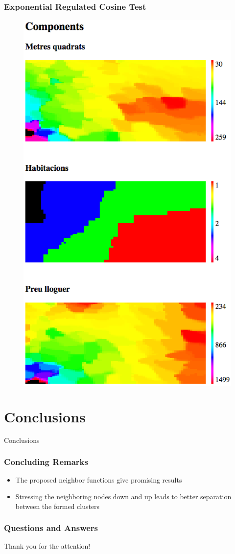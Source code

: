 \documentclass{beamer}
\begin{document}
\begin{frame}
\frametitle{Exponential Regulated Cosine Test}
\begin{figure}[h]
  \centering
  \includegraphics[width=1.0\textwidth,height=0.6\textwidth]{fig02c}
  \label{fig02c}
\end{figure}
\end{frame}

\section{Conclusions}

\begin{frame}
\center \huge{Conclusions}
\end{frame}

\begin{frame}
\frametitle{Concluding Remarks}
\begin{itemize}
  \item The proposed neighbor functions give promising results
  \item Stressing the neighboring nodes down and up leads to better separation between the formed clusters
\end{itemize}
\end{frame}

\begin{frame}
\frametitle{Questions and Answers}
\center \huge{Thank you for the attention!}
\end{frame}
\end{document}
